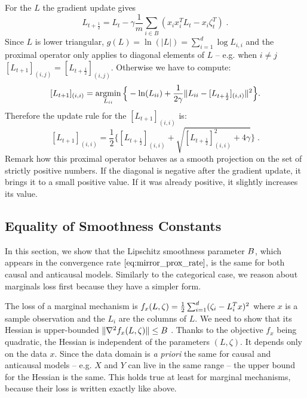 \begin{subappendices}
For the $L$ the gradient update gives 
\[
    L_{t+\frac{1}{2}} = L_t - \gamma \frac{1}{m} \sum_{i \in B} (x_i x_i^T L_t - x_i \zeta^T_t) \; . 
\]
Since $L$ is lower triangular,  $g(L) = \ln(|L|) = \sum_{i=1}^d \log L_{i,i}$ and the proximal operator only applies to diagonal elements of $L$ 
-- e.g. when $i\neq j$ $[L_{t+1}]_{(i,j)} = [L_{t+\frac{1}{2}}]_{(i,j)}$. Otherwise we have to compute: 
\[
    [L_{t+1}]_{(i,i)} 
    =\operatorname*{argmin}_{L_{ii}} \Big\{ 
    - \ln(L_{ii}) 
    + \frac{1}{2\gamma}{\| L_{ii} - [L_{t+\frac{1}{2}}]_{(i,i)}\|^2}\Big\}.
\]
Therefore the update rule for the $[L_{t+1}]_{(i,i)}$ is: 
\[
    [L_{t+1}]_{(i,i)} 
    = \frac{1}{2}\Big\{[L_{t+\frac{1}{2}}]_{(i,i)} 
    + \sqrt{[L_{t+\frac{1}{2}}]_{(i,i)}^2 +4\gamma}\Big\} \; .
\]
Remark how this proximal operator behaves as a smooth projection on the set of strictly positive numbers. If the diagonal is negative after the gradient update, it brings  it to a small positive value. If  it was already positive, it slightly increases its value.



\subsection{Equality of Smoothness Constants}
\label{apdx:normal_constants}

In this section, we show that the Lipschitz smoothness parameter $B$, which appears in the convergence rate $\eqref{eq:mirror_prox_rate}$, is the same for both  causal and anticausal models.
Similarly to the categorical case, we reason about marginals loss first because they have a simpler form. 

The loss of a marginal mechanism is
$f_x(L,\zeta)=\frac{1}{2} \sum_{i=1}^d (\zeta_i - L_i^T x)^2$
where $x$ is a sample observation and the $L_i$ are the columns of $L$.
We need to show that its Hessian is upper-bounded $\|\nabla^2 f_x(L,\zeta)\| \leq B$ .
Thanks to the objective $f_x$ being quadratic, the Hessian is independent of the parameters $(L,\zeta)$.
It depends only on the data $x$.
Since the data domain is \textit{a priori} the same for causal and anticausal models
-- e.g. $X$ and $Y$ can live in the same range --
the upper bound for the Hessian is the same.
This holds true at least for marginal mechanisms, because their loss is written exactly like above. 



\end{subappendices}
